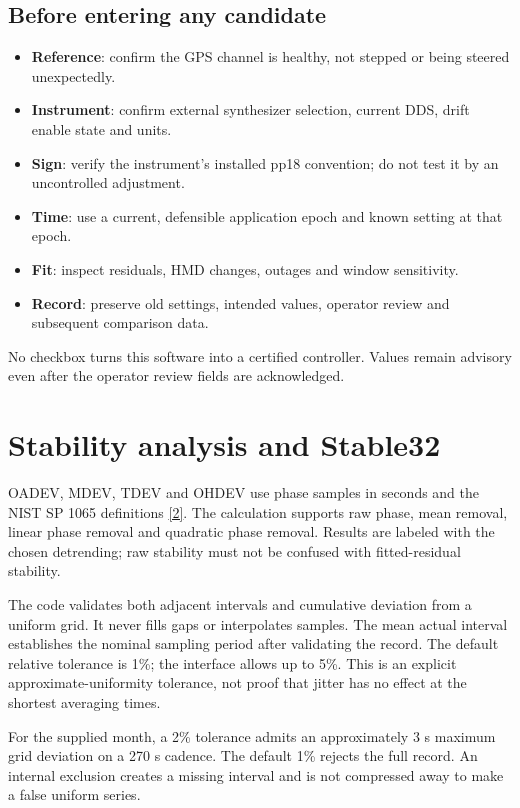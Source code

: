 \documentclass[11pt,a4paper]{article}
\newcommand{\nist}{\href{https://tf.nist.gov/general/pdf/2220.pdf}{[2]}}
\begin{document}
\subsection{Before entering any candidate}
\begin{itemize}
\item \textbf{Reference}: confirm the GPS channel is healthy, not stepped or being steered unexpectedly.
\item \textbf{Instrument}: confirm external synthesizer selection, current DDS, drift enable state and units.
\item \textbf{Sign}: verify the instrument's installed pp18 convention; do not test it by an uncontrolled adjustment.
\item \textbf{Time}: use a current, defensible application epoch and known setting at that epoch.
\item \textbf{Fit}: inspect residuals, HMD changes, outages and window sensitivity.
\item \textbf{Record}: preserve old settings, intended values, operator review and subsequent comparison data.
\end{itemize}

No checkbox turns this software into a certified controller. Values remain
advisory even after the operator review fields are acknowledged.
\clearpage

\section{Stability analysis and Stable32}
OADEV, MDEV, TDEV and OHDEV use phase samples in seconds and the NIST SP 1065
definitions \nist. The calculation supports raw phase, mean removal, linear
phase removal and quadratic phase removal. Results are labeled with the chosen
detrending; raw stability must not be confused with fitted-residual stability.

The code validates both adjacent intervals and cumulative deviation from a
uniform grid. It never fills gaps or interpolates samples. The mean actual
interval establishes the nominal sampling period after validating the record.
The default relative tolerance is 1\%; the interface allows up to 5\%.
This is an explicit approximate-uniformity tolerance, not proof that jitter
has no effect at the shortest averaging times.

For the supplied month, a 2\% tolerance admits an approximately 3 s maximum
grid deviation on a 270 s cadence. The default 1\% rejects the full record.
An internal exclusion creates a missing interval and is not compressed away
to make a false uniform series.
\end{document}
